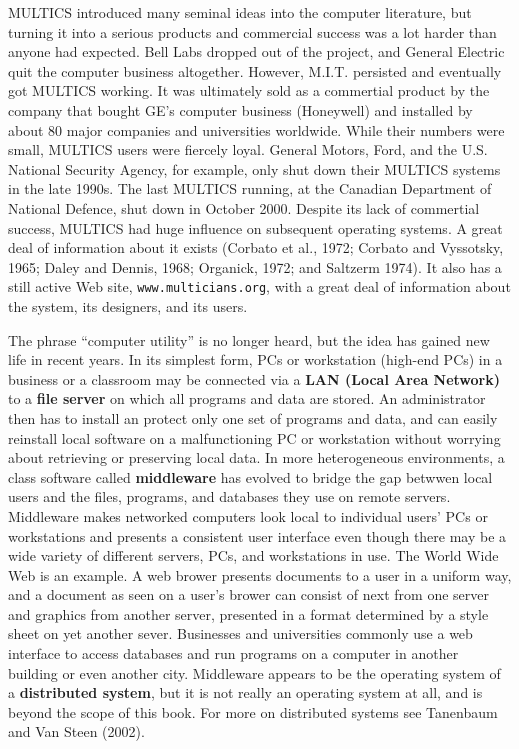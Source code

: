\documentclass{book}
\newcommand {\kw}  [1] {\textbf{#1}}
\newcommand {\www} [1] {\texttt{#1}}
\begin{document}
MULTICS introduced many seminal ideas into the computer literature, 
but turning it into a serious products and commercial success was a lot harder than anyone had expected.
Bell Labs dropped out of the project, and General Electric quit the computer business altogether.
However, M.I.T. persisted and eventually got MULTICS working.
It was ultimately sold as a commertial product by the company that bought GE's computer business (Honeywell) 
and installed by about 80 major companies and universities worldwide.
While their numbers were small, MULTICS users were fiercely loyal.
General Motors, Ford, and the U.S. National Security Agency, for example, only shut down their MULTICS systems in the late 1990s.
The last MULTICS running, at the Canadian Department of National Defence, shut down in October 2000.
Despite its lack of commertial success, MULTICS had huge influence on subsequent operating systems.
A great deal of information about it exists 
(Corbato et al., 1972; Corbato and Vyssotsky, 1965; Daley and Dennis, 1968; Organick, 1972; and Saltzerm 1974).
It also has a still active Web site, \www{www.multicians.org}, with a great deal of information about the system, its designers, and its users.

The phrase ``computer utility'' is no longer heard, but the idea has gained new life in recent years.
In its simplest form, PCs or workstation (high-end PCs) in a business or a classroom 
may be connected via a \kw{LAN (Local Area Network)} to a \kw{file server} on which all programs and data are stored.
An administrator then has to install an protect only one set of programs and data, 
and can easily reinstall local software on a malfunctioning PC or workstation without worrying about retrieving or preserving local data.
In more heterogeneous environments, a class software called \kw{middleware} has evolved 
to bridge the gap betwwen local users and the files, programs, and databases they use on remote servers.
Middleware makes networked computers look local to individual users' PCs or workstations 
and presents a consistent user interface even though there may be a wide variety of different servers, PCs, and workstations in use.
The World Wide Web is an example.
A web brower presents documents to a user in a uniform way, and a document as seen on a user's brower can consist of next from one server 
and graphics from another server, presented in a format determined by a style sheet on yet another sever.
Businesses and universities commonly use a web interface to access databases and run programs on a computer in another building or even another city.
Middleware appears to be the operating system of a \kw{distributed system}, 
but it is not really an operating system at all, and is beyond the scope of this book.
For more on distributed systems see Tanenbaum and Van Steen (2002).
\end{document}
